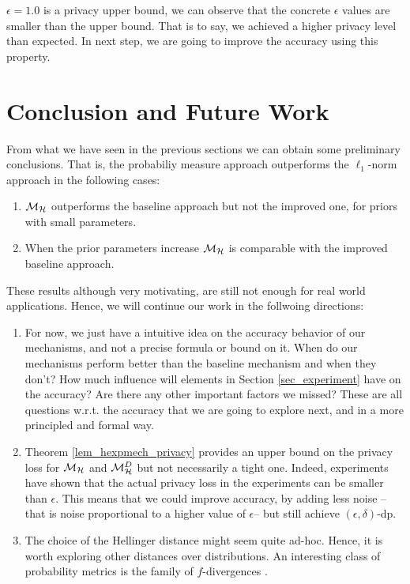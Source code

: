 \documentclass{article}
\begin{document}
$\epsilon = 1.0$ is a privacy upper bound, we can observe that the concrete $\epsilon$ values are smaller than the upper bound. That is to say, we achieved a higher privacy level than expected. In next step, we are going to improve the accuracy using this property.


\section{Conclusion and Future Work}
From what we have seen in the previous sections we can obtain some preliminary conclusions. That is, the probabiliy measure approach outperforms the $\ell_1$-norm approach in the following cases:

\begin{enumerate}
	\item  $\mathcal{M}_{\mathcal{H}}$ outperforms the baseline approach but not the improved one, for priors with small parameters.
  	\item When the prior parameters increase $\mathcal{M}_{\mathcal{H}}$ is comparable with the improved baseline approach.
\end{enumerate}

These results although very motivating, are still not enough for real world applications. Hence, we will continue our work in the follwoing directions:
\begin{enumerate}
  \item  For now, we just have a intuitive idea on the accuracy
behavior of our mechanisms, and not a precise formula or bound on
it. When do our mechanisms perform better than the baseline mechanism
and when they don't? How much influence will elements in Section
\ref{sec_experiment} have on the accuracy? Are there any other
important factors we missed? These are all questions w.r.t. the
accuracy that we are going to explore next, and in a more principled
and formal way.
\item  Theorem \ref{lem_hexpmech_privacy} provides an upper bound on the
privacy loss for $\mathcal{M}_{\mathcal{H}}$ and $\mathcal{M}^{D}_{\mathcal{H}}$ but not necessarily a
tight one. Indeed, experiments have shown that the actual privacy loss
in the experiments can be smaller than $\epsilon$. This means that we
could improve accuracy, by adding less noise -- that is noise
proportional to a higher value of $\epsilon$-- but still achieve
$(\epsilon, \delta)$-dp.
\item The choice of the Hellinger distance might seem quite
ad-hoc. Hence, it is worth exploring other distances over
distributions. An interesting class of probability metrics is the
family of $f$-divergences \cite{CIT-004}.
\end{enumerate}




\end{document}

